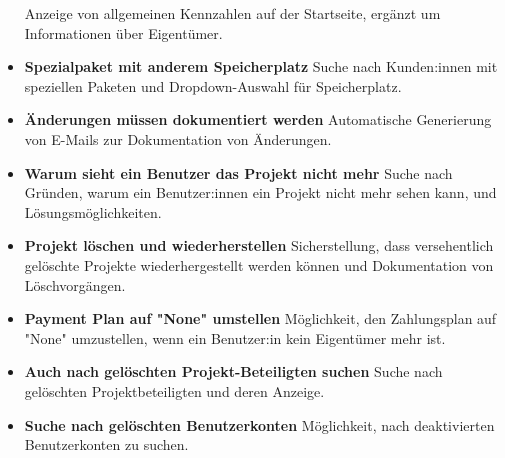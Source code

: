 \begin{itemize}
        \newline
        Anzeige von allgemeinen Kennzahlen auf der Startseite, ergänzt um Informationen über Eigentümer.
    \item \textbf{Spezialpaket mit anderem Speicherplatz}
        \newline
        Suche nach Kunden:innen mit speziellen Paketen und Dropdown-Auswahl für Speicherplatz.
    \item \textbf{Änderungen müssen dokumentiert werden}
        \newline
        Automatische Generierung von E-Mails zur Dokumentation von Änderungen.
    \item \textbf{Warum sieht ein Benutzer das Projekt nicht mehr}
        \newline
        Suche nach Gründen, warum ein Benutzer:innen ein Projekt nicht mehr sehen kann, und Lösungsmöglichkeiten.
    \item \textbf{Projekt löschen und wiederherstellen}
        \newline
        Sicherstellung, dass versehentlich gelöschte Projekte wiederhergestellt werden können und Dokumentation von Löschvorgängen.
    \item \textbf{Payment Plan auf "None" umstellen}
        \newline
        Möglichkeit, den Zahlungsplan auf "None" umzustellen, wenn ein Benutzer:in kein Eigentümer mehr ist.
    \item \textbf{Auch nach gelöschten Projekt-Beteiligten suchen}
        \newline
        Suche nach gelöschten Projektbeteiligten und deren Anzeige.
    \item \textbf{Suche nach gelöschten Benutzerkonten}
        \newline
        Möglichkeit, nach deaktivierten Benutzerkonten zu suchen.
\end{itemize}
\newpage